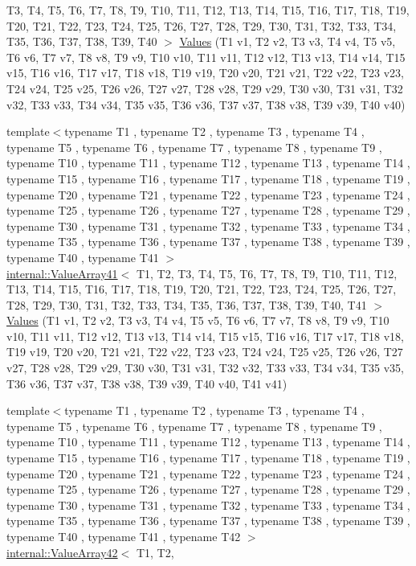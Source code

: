 \begin{DoxyCompactItemize}
\-T3, \-T4, \-T5, \-T6, \-T7, \-T8, \-T9, \*
\-T10, \-T11, \-T12, \-T13, \-T14, \-T15, \*
\-T16, \-T17, \-T18, \-T19, \-T20, \-T21, \*
\-T22, \-T23, \-T24, \-T25, \-T26, \-T27, \*
\-T28, \-T29, \-T30, \-T31, \-T32, \-T33, \*
\-T34, \-T35, \-T36, \-T37, \-T38, \-T39, \*
\-T40 $>$ \hyperlink{namespacetesting_adaa8b96d44c103a70e5c4a4b3430ef4d}{\-Values} (\-T1 v1, \-T2 v2, \-T3 v3, \-T4 v4, \-T5 v5, \-T6 v6, \-T7 v7, \-T8 v8, \-T9 v9, \-T10 v10, \-T11 v11, \-T12 v12, \-T13 v13, \-T14 v14, \-T15 v15, \-T16 v16, \-T17 v17, \-T18 v18, \-T19 v19, \-T20 v20, \-T21 v21, \-T22 v22, \-T23 v23, \-T24 v24, \-T25 v25, \-T26 v26, \-T27 v27, \-T28 v28, \-T29 v29, \-T30 v30, \-T31 v31, \-T32 v32, \-T33 v33, \-T34 v34, \-T35 v35, \-T36 v36, \-T37 v37, \-T38 v38, \-T39 v39, \-T40 v40)
\item 
{\footnotesize template$<$typename T1 , typename T2 , typename T3 , typename T4 , typename T5 , typename T6 , typename T7 , typename T8 , typename T9 , typename T10 , typename T11 , typename T12 , typename T13 , typename T14 , typename T15 , typename T16 , typename T17 , typename T18 , typename T19 , typename T20 , typename T21 , typename T22 , typename T23 , typename T24 , typename T25 , typename T26 , typename T27 , typename T28 , typename T29 , typename T30 , typename T31 , typename T32 , typename T33 , typename T34 , typename T35 , typename T36 , typename T37 , typename T38 , typename T39 , typename T40 , typename T41 $>$ }\\\hyperlink{classtesting_1_1internal_1_1ValueArray41}{internal\-::\-Value\-Array41}$<$ \-T1, \-T2, \*
\-T3, \-T4, \-T5, \-T6, \-T7, \-T8, \-T9, \*
\-T10, \-T11, \-T12, \-T13, \-T14, \-T15, \*
\-T16, \-T17, \-T18, \-T19, \-T20, \-T21, \*
\-T22, \-T23, \-T24, \-T25, \-T26, \-T27, \*
\-T28, \-T29, \-T30, \-T31, \-T32, \-T33, \*
\-T34, \-T35, \-T36, \-T37, \-T38, \-T39, \*
\-T40, \-T41 $>$ \hyperlink{namespacetesting_a51df725741cfcc9539c48885fc2728b0}{\-Values} (\-T1 v1, \-T2 v2, \-T3 v3, \-T4 v4, \-T5 v5, \-T6 v6, \-T7 v7, \-T8 v8, \-T9 v9, \-T10 v10, \-T11 v11, \-T12 v12, \-T13 v13, \-T14 v14, \-T15 v15, \-T16 v16, \-T17 v17, \-T18 v18, \-T19 v19, \-T20 v20, \-T21 v21, \-T22 v22, \-T23 v23, \-T24 v24, \-T25 v25, \-T26 v26, \-T27 v27, \-T28 v28, \-T29 v29, \-T30 v30, \-T31 v31, \-T32 v32, \-T33 v33, \-T34 v34, \-T35 v35, \-T36 v36, \-T37 v37, \-T38 v38, \-T39 v39, \-T40 v40, \-T41 v41)
\item 
{\footnotesize template$<$typename T1 , typename T2 , typename T3 , typename T4 , typename T5 , typename T6 , typename T7 , typename T8 , typename T9 , typename T10 , typename T11 , typename T12 , typename T13 , typename T14 , typename T15 , typename T16 , typename T17 , typename T18 , typename T19 , typename T20 , typename T21 , typename T22 , typename T23 , typename T24 , typename T25 , typename T26 , typename T27 , typename T28 , typename T29 , typename T30 , typename T31 , typename T32 , typename T33 , typename T34 , typename T35 , typename T36 , typename T37 , typename T38 , typename T39 , typename T40 , typename T41 , typename T42 $>$ }\\\hyperlink{classtesting_1_1internal_1_1ValueArray42}{internal\-::\-Value\-Array42}$<$ \-T1, \-T2, \*

\end{DoxyCompactItemize}
